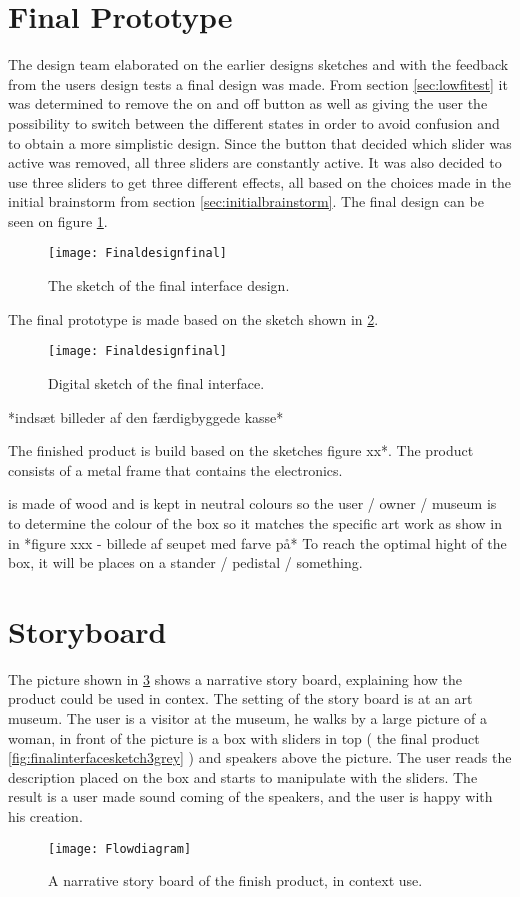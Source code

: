 \section{Final Prototype}\label{sec:finaldesign final}
The design team elaborated on the earlier designs sketches and with the feedback from the users design tests a final design was made. From section \ref{sec:lowfitest} it was determined to remove the on and off button as well as giving the user the possibility to switch between the different states in order to avoid confusion and to obtain a more simplistic design. Since the button that decided which slider was active was removed, all three sliders are constantly active. It was also decided to use three sliders to get three different effects, all based on the choices made in the initial brainstorm from section \ref{sec:initialbrainstorm}. The final design can be seen on figure \ref{fig:finaldesignsketch3grey}.

\begin{figure}[!h] 
\centering
\texttt{[image: Finaldesignfinal]}
\caption{\label{fig:finaldesignsketch3grey} The sketch of the final interface design.}
\end{figure}  
 
The final prototype is made based on the sketch shown in \ref{fig:Finaldesignfinal}.

\begin{figure}[!h] 
\centering
\texttt{[image: Finaldesignfinal]}
\caption{\label{fig:Finaldesignfinal} Digital sketch of the final interface.}
\end{figure}  

*indsæt billeder af den færdigbyggede kasse* 

The finished product is build based on the sketches figure xx*. The product consists of a metal frame that contains the electronics. 

is made of wood and is kept in neutral colours so the user / owner / museum is to determine the colour of the box so it matches the specific art work as show in in *figure xxx - billede af seupet med farve på* To reach the optimal hight of the box, it will be places on a stander / pedistal / something. 


\section{Storyboard}\label{sec:storyboard}
The picture shown in \ref{fig:Flowdiagram} shows a narrative story board, explaining how the product could be used in contex. The setting of the story board is at an art museum. The user is a visitor at the museum, he walks by a large picture of a woman, in front of the picture is a box with sliders in top ( the final product \ref{fig:finalinterfacesketch3grey} ) and speakers above the picture. The user reads the description placed on the box and starts to manipulate with the sliders. The result is a user made sound coming of the speakers, and the user is happy with his creation. 

\begin{figure}[!h] 
\centering
\texttt{[image: Flowdiagram]}
\caption{\label{fig:Flowdiagram} A narrative story board of the finish product,  in context use.}
\end{figure}





